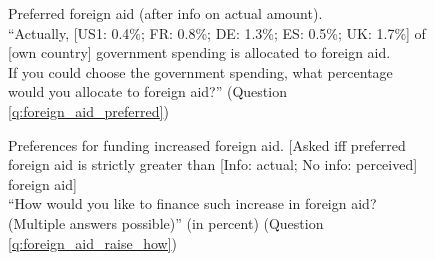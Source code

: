 \begin{figure}[h!]
    \caption[Preferred foreign aid (after info on actual amount)]{Preferred foreign aid (after info on actual amount). \\ ``Actually,
    [US1: 0.4\%; FR: 0.8\%; DE: 1.3\%; ES: 0.5\%; UK: 1.7\%] of [own country] government spending is allocated to foreign aid. \\
    If you could choose the government spending, what percentage would you allocate
    to foreign aid?'' (Question \ref{q:foreign_aid_preferred})}\label{fig:foreign_aid_preferred_info}
\end{figure}

\begin{figure}[h!]
    \caption[Preferences for funding increased foreign aid]{Preferences for funding increased foreign aid. [Asked iff preferred foreign aid is strictly greater than [Info: actual; No info: perceived] foreign aid] \\ ``How would you like to finance such increase in foreign aid? (Multiple answers possible)'' (in percent) (Question \ref{q:foreign_aid_raise_how})}\label{fig:foreign_aid_raise_how}
\end{figure}

